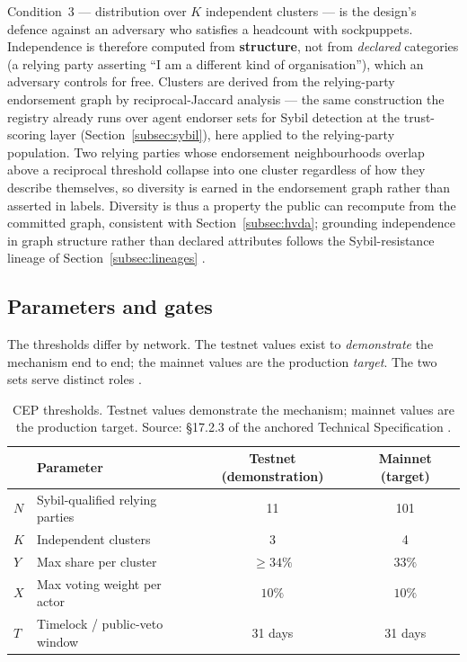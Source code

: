 Condition~3 — distribution over $K$ independent clusters — is the design's defence against an adversary who satisfies a headcount with sockpuppets. Independence is therefore computed from \textbf{structure}, not from \emph{declared} categories (a relying party asserting ``I am a different kind of organisation''), which an adversary controls for free. Clusters are derived from the relying-party endorsement graph by reciprocal-Jaccard analysis — the same construction the registry already runs over agent endorser sets for Sybil detection at the trust-scoring layer (Section~\ref{subsec:sybil}), here applied to the relying-party population. Two relying parties whose endorsement neighbourhoods overlap above a reciprocal threshold collapse into one cluster regardless of how they describe themselves, so diversity is earned in the endorsement graph rather than asserted in labels. Diversity is thus a property the public can recompute from the committed graph, consistent with Section~\ref{subsec:hvda}; grounding independence in graph structure rather than declared attributes follows the Sybil-resistance lineage of Section~\ref{subsec:lineages} \cite{ref40_sybilguard,ref41_brightid}.

\subsection{Parameters and gates}
\label{subsec:params}

The thresholds differ by network. The testnet values exist to \emph{demonstrate} the mechanism end to end; the mainnet values are the production \emph{target}. The two sets serve distinct roles \cite{ref28_techspec}.

\begin{table}[ht]
\centering
\small
\begin{tabular}{@{}llcc@{}}
\toprule
 & \textbf{Parameter} & \textbf{Testnet (demonstration)} & \textbf{Mainnet (target)} \\
\midrule
$N$ & Sybil-qualified relying parties & 11 & 101 \\
$K$ & Independent clusters & 3 & 4 \\
$Y$ & Max share per cluster & $\ge 34\%$ & $33\%$ \\
$X$ & Max voting weight per actor & $10\%$ & $10\%$ \\
$T$ & Timelock / public-veto window & 31 days & 31 days \\
\bottomrule
\end{tabular}
\caption{CEP thresholds. Testnet values demonstrate the mechanism; mainnet values are the production target. Source: \S17.2.3 of the anchored Technical Specification \cite{ref28_techspec}.}
\label{tab:cep-params}
\end{table}

